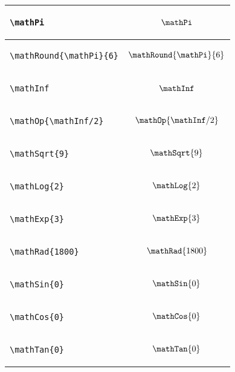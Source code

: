 \documentclass{article}
\begin{document}
\begin{center}
\begin{longtable}{lc}
\begin{lstlisting}
\mathPi
\end{lstlisting} & \(\mathPi\)\\
\midrule


\begin{lstlisting}
\mathRound{\mathPi}{6}
\end{lstlisting} & \(\mathRound{\mathPi}{6}\)\\
\midrule

\begin{lstlisting}
\mathInf
\end{lstlisting} & \(\mathInf\)\\
\midrule

\begin{lstlisting}
\mathOp{\mathInf/2}
\end{lstlisting} &\(\mathOp{\mathInf/2}\) \\
\midrule

\begin{lstlisting}
\mathSqrt{9}
\end{lstlisting} & \(\mathSqrt{9}\)\\
\midrule

\begin{lstlisting}
\mathLog{2}
\end{lstlisting} & \(\mathLog{2}\)\\
\midrule

\begin{lstlisting}
\mathExp{3}
\end{lstlisting} & \(\mathExp{3}\) \\
\midrule

\begin{lstlisting}
\mathRad{1800}
\end{lstlisting} & \(\mathRad{1800}\)\\
\midrule


\begin{lstlisting}
\mathSin{0}
\end{lstlisting} &\(\mathSin{0}\)\\
\midrule

\begin{lstlisting}
\mathCos{0}
\end{lstlisting} & \(\mathCos{0}\)\\
\midrule


\begin{lstlisting}
\mathTan{0}
\end{lstlisting} & \(\mathTan{0}\)\\
\midrule


\end{longtable}
\end{center}
\end{document}
